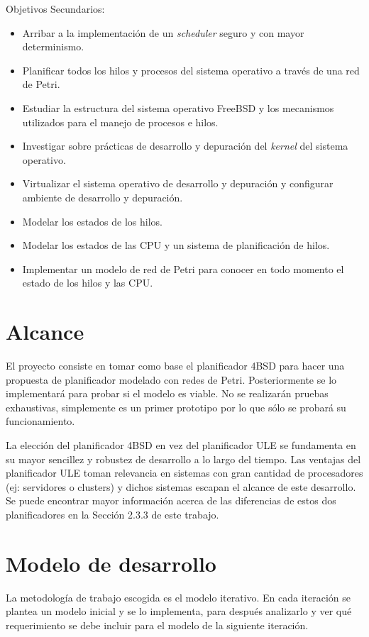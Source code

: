 \documentclass[a4paper]{book}
\begin{document}
Objetivos Secundarios:
\begin{itemize}
\item Arribar a la implementaci\'on de un \emph{scheduler} seguro y con mayor determinismo.
\item Planificar todos los hilos y procesos del sistema operativo a trav\'es de una red de Petri.
\item Estudiar la estructura del sistema operativo FreeBSD y los mecanismos utilizados para el manejo de procesos e hilos.
\item Investigar sobre pr\'acticas de desarrollo y depuraci\'on del \emph{kernel} del sistema operativo.
\item Virtualizar el sistema operativo de desarrollo y depuraci\'on y configurar ambiente de desarrollo y depuraci\'on.
\item Modelar los estados de los hilos.
\item Modelar los estados de las CPU y un sistema de planificación de hilos.
\item Implementar un modelo de red de Petri para conocer en todo momento el estado de los hilos y las CPU.
\end{itemize}


\section{Alcance}

El proyecto consiste en tomar como base el planificador 4BSD para hacer una propuesta de planificador modelado con redes de Petri. Posteriormente se lo implementar\'a para probar si el modelo es viable. No se realizar\'an pruebas exhaustivas, simplemente es un primer prototipo por lo que sólo se probar\'a su funcionamiento.

La elección del planificador 4BSD en vez del planificador ULE se fundamenta en su mayor sencillez y robustez de desarrollo a lo largo del tiempo. Las ventajas del planificador ULE toman relevancia en sistemas con gran cantidad de procesadores (ej: servidores o clusters) y dichos sistemas escapan el alcance de este desarrollo. Se puede encontrar mayor información acerca de las diferencias de estos dos planificadores en la Sección 2.3.3 de este trabajo.

\section{Modelo de desarrollo}
La metodolog\'ia de trabajo escogida es el modelo iterativo. En cada iteraci\'on se plantea un modelo inicial y se lo implementa, para despu\'es analizarlo y ver qué requerimiento se debe incluir para el modelo de la siguiente iteraci\'on.
\end{document}
